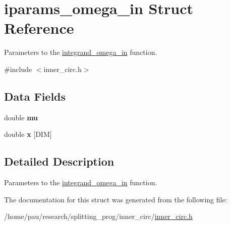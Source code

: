 \hypertarget{structiparams__omega__in}{
\section{iparams\_\-omega\_\-in Struct Reference}
\label{structiparams__omega__in}
}


Parameters to the \hyperlink{inner__circ_8h_add386ab1cbaa441219d25f4b52e2f53d}{integrand\_\-omega\_\-in} function.  




{\ttfamily \#include $<$inner\_\-circ.h$>$}

\subsection*{Data Fields}
\begin{DoxyCompactItemize}
\item 
\hypertarget{structiparams__omega__in_a74577585cf12d1712ab9c57616d49205}{
double {\bfseries mu}}
\label{structiparams__omega__in_a74577585cf12d1712ab9c57616d49205}

\item 
\hypertarget{structiparams__omega__in_acd2fef19c5a0b30fb3fc38dd55615a2c}{
double {\bfseries x} \mbox{[}DIM\mbox{]}}
\label{structiparams__omega__in_acd2fef19c5a0b30fb3fc38dd55615a2c}

\end{DoxyCompactItemize}


\subsection{Detailed Description}
Parameters to the \hyperlink{inner__circ_8h_add386ab1cbaa441219d25f4b52e2f53d}{integrand\_\-omega\_\-in} function. 

The documentation for this struct was generated from the following file:\begin{DoxyCompactItemize}
\item 
/home/pau/research/splitting\_\-prog/inner\_\-circ/\hyperlink{inner__circ_8h}{inner\_\-circ.h}\end{DoxyCompactItemize}
